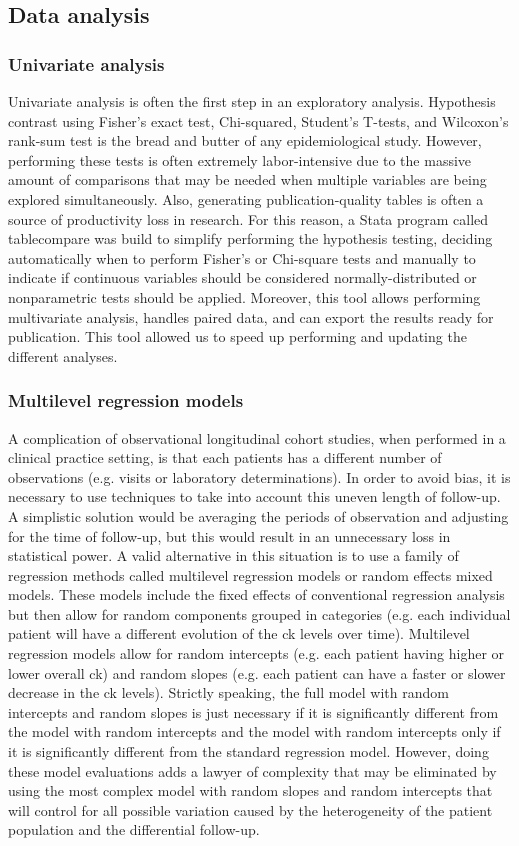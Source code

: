 \subsection{Data analysis}
\subsubsection{Univariate analysis}
Univariate analysis is often the first step in an exploratory analysis. Hypothesis contrast using Fisher's exact test, Chi-squared, Student's T-tests, and Wilcoxon's rank-sum test is the bread and butter of any epidemiological study. However, performing these tests is often extremely labor-intensive due to the massive amount of comparisons that may be needed when multiple variables are being explored simultaneously. Also, generating publication-quality tables is often a source of productivity loss in research. For this reason, a Stata program called table\textunderscore compare was build to simplify performing the hypothesis testing, deciding automatically when to perform Fisher's or Chi-square tests and manually to indicate if continuous variables should be considered normally-distributed or nonparametric tests should be applied. Moreover, this tool allows performing multivariate analysis, handles paired data, and can export the results ready for publication. This tool allowed us to speed up performing and updating the different analyses.

\subsubsection{Multilevel regression models}
A complication of observational longitudinal cohort studies, when performed in a clinical practice setting, is that each patients has a different number of observations (e.g. visits or laboratory determinations). In order to avoid bias, it is necessary to use techniques to take into account this uneven length of follow-up. A simplistic solution would be averaging the periods of observation and adjusting for the time of follow-up, but this would result in an unnecessary loss in statistical power. A valid alternative in this situation is to use a family of regression methods called multilevel regression models or random effects mixed models. These models include the fixed effects of conventional regression analysis but then allow for random components grouped in categories (e.g. each individual patient will have a different evolution of the \gls{ck} levels over time). Multilevel regression models allow for random intercepts (e.g. each patient having higher or lower overall \gls{ck}) and random slopes (e.g. each patient can have a faster or slower decrease in the \gls{ck} levels). Strictly speaking, the full model with random intercepts and random slopes is just necessary if it is significantly different from the model with random intercepts and the model with random intercepts only if it is significantly different from the standard regression model. However, doing these model evaluations adds a lawyer of complexity that may be eliminated by using the most complex model with random slopes and random intercepts that will control for all possible variation caused by the heterogeneity of the patient population and the differential follow-up.

